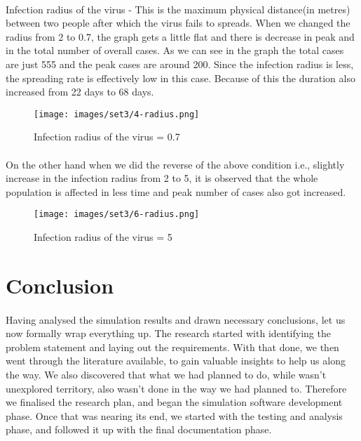 \documentclass[12pt, a4paper]{extarticle}
\begin{document}
    \newpage
    \paragraph{} Infection radius of the virus - This is the maximum physical distance(in metres) between two people after which the virus fails to spreads. When we changed the radius from 2 to 0.7, the graph gets a little flat and there is decrease in peak and in the total number of overall cases. As we can see in the graph the total cases are just 555 and the peak cases are around 200. Since the infection radius is less, the spreading rate is effectively low in this case. Because of this the duration also increased from 22 days to 68 days.
    \vspace{0.2in}
    \begin{figure}[h]
        \centering
        \texttt{[image: images/set3/4-radius.png]}
        \caption{Infection radius of the virus = 0.7}
    \end{figure}

    \newpage
    \paragraph{} On the other hand when we did the reverse of the above condition i.e., slightly increase in the infection radius from 2 to 5, it is observed that the whole population is affected in less time and peak number of cases also got increased.
    \vspace{0.2in}
    \begin{figure}[h]
        \centering
        \texttt{[image: images/set3/6-radius.png]}
        \caption{Infection radius of the virus = 5}
    \end{figure}
    
    \newpage
    \section{Conclusion}
        \paragraph{} Having analysed the simulation results and drawn necessary conclusions, let us now formally wrap everything up. The research started with identifying the problem statement and laying out the requirements. With that done, we then went through the literature available, to gain valuable insights to help us along the way. We also discovered that what we had planned to do, while wasn't unexplored territory, also wasn't done in the way we had planned to. Therefore we finalised the research plan, and began the simulation software development phase. Once that was nearing its end, we started with the testing and analysis phase, and followed it up with the final documentation phase.
\end{document}

